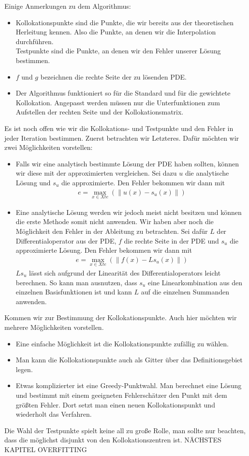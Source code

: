 Einige Anmerkungen zu dem Algorithmus:
\begin{itemize}
\item
Kollokationspunkte sind die Punkte, die wir bereits aus der theoretischen Herleitung kennen. Also die Punkte, an denen wir die Interpolation durchführen.\\
Testpunkte sind die Punkte, an denen wir den Fehler unserer Lösung bestimmen.
\item
$f$ und $g$ bezeichnen die rechte Seite der zu lösenden \gls{PDE}.
\item
Der Algorithmus funktioniert so für die Standard und für die gewichtete Kollokation. Angepasst werden müssen nur die Unterfunktionen zum Aufstellen der rechten Seite und der Kollokationsmatrix.
\end{itemize}
Es ist noch offen wie wir die Kollokations- und Testpunkte und den Fehler in jeder Iteration bestimmen. Zuerst betrachten wir Letzteres. Dafür möchten wir zwei Möglichkeiten vorstellen:
\begin{itemize}
\item
Falls wir eine analytisch bestimmte Lösung der \gls{PDE} haben sollten, können wir diese mit der approximierten vergleichen. Sei dazu $u$ die analytische Lösung und $s_u$ die approximierte. Den Fehler bekommen wir dann mit
\begin{align*}
e = \max_{x \in Xte} \left(\left\| u(x) - s_u(x) \right\| \right)
\end{align*}
\item
Eine analytische Lösung werden wir jedoch meist nicht besitzen und können die erste Methode somit nicht anwenden. Wir haben aber noch die Möglichkeit den Fehler in der Ableitung zu betrachten. Sei dafür $L$ der Differentialoperator aus der \gls{PDE}, $f$ die rechte Seite in der \gls{PDE} und $s_u$ die approximierte Lösung. Den Fehler bekommen wir dann mit
\begin{align*}
e = \max_{x \in Xte} \left(\left\| f(x) - L s_u(x) \right\| \right)
\end{align*}
$Ls_u$ lässt sich aufgrund der Linearität des Differentialoperators leicht berechnen. So kann man ausnutzen, dass $s_u$ eine Linearkombination aus den einzelnen Basisfunktionen ist und kann $L$ auf die einzelnen Summanden anwenden.
\end{itemize}

Kommen wir zur Bestimmung der Kollokationspunkte. Auch hier möchten wir mehrere Möglichkeiten vorstellen.
\begin{itemize}
\item
Eine einfache Möglichkeit ist die Kollokationspunkte zufällig zu wählen.
\item
Man kann die Kollokationspunkte auch als Gitter über das Definitionsgebiet legen.
\item
Etwas komplizierter ist eine Greedy-Punktwahl. Man berechnet eine Lösung und bestimmt mit einem geeigneten Fehlerschätzer den Punkt mit dem größten Fehler. Dort setzt man einen neuen Kollokationspunkt und wiederholt das Verfahren.
\end{itemize}

Die Wahl der Testpunkte spielt keine all zu große Rolle, man sollte nur beachten, dass die möglichst disjunkt von den Kollokationszentren ist. NÄCHSTES KAPITEL OVERFITTING